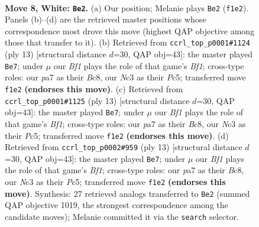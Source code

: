 \documentclass[11pt]{article}
\begin{document}
\begin{figure}[p]\centering
\begin{subfigure}{0.46\textwidth}\centering
\resizebox{\linewidth}{!}{%
\newchessgame
\chessboard[
  setfen={rnbq1rk1/pp2bppp/4pn2/2Pp4/3P4/2N2N2/PP3PPP/R1BQKB1R w KQ - 1 8},
  showmover=false,
  pgfstyle=straightmove, color=movearrow, markmove={f1-e2}
]}
\caption{}
\end{subfigure}\hfill
\begin{subfigure}{0.46\textwidth}\centering
\resizebox{\linewidth}{!}{%
\newchessgame
\chessboard[
  setfen={r1bqkb1r/pp3ppp/2n2n2/2pp4/3P4/5NP1/PP2PPBP/RNBQ1RK1 b kq - 4 7},
  showmover=false,
  pgfstyle=straightmove, color=movearrow, markmove={f8-e7}
]}
\caption{}
\end{subfigure}
\\[4pt]
\begin{subfigure}{0.46\textwidth}\centering
\resizebox{\linewidth}{!}{%
\newchessgame
\chessboard[
  setfen={r1bqkb1r/pp3ppp/2n2n2/2pp4/3P4/5NP1/PP2PPBP/RNBQ1RK1 b kq - 4 7},
  showmover=false,
  pgfstyle=straightmove, color=movearrow, markmove={f8-e7}
]}
\caption{}
\end{subfigure}\hfill
\begin{subfigure}{0.46\textwidth}\centering
\resizebox{\linewidth}{!}{%
\newchessgame
\chessboard[
  setfen={r1bqkb1r/pp3ppp/2n2n2/2pp4/3P4/5NP1/PP2PPBP/RNBQ1RK1 b kq - 4 7},
  showmover=false,
  pgfstyle=straightmove, color=movearrow, markmove={f8-e7}
]}
\caption{}
\end{subfigure}
\caption{\textbf{Move 8, White: \texttt{Be2}.} (a) Our position; Melanie plays \texttt{Be2} (\texttt{f1e2}). Panels (b)--(d) are the retrieved master positions whose correspondence most drove this move (highest QAP objective among those that transfer to it). (b) Retrieved from \texttt{ccrl\_top\_p0001\#1124} (ply 13) [structural distance $d$=30, QAP obj=43]: the master played \texttt{Be7}; under $\mu$ our \emph{Bf1} plays the role of that game's \emph{Bf1}; cross-type roles: our \emph{p}a7 as their \emph{B}c8, our \emph{N}c3 as their \emph{P}c5; transferred move \texttt{f1e2} \textbf{(endorses this move)}. (c) Retrieved from \texttt{ccrl\_top\_p0001\#1125} (ply 13) [structural distance $d$=30, QAP obj=43]: the master played \texttt{Be7}; under $\mu$ our \emph{Bf1} plays the role of that game's \emph{Bf1}; cross-type roles: our \emph{p}a7 as their \emph{B}c8, our \emph{N}c3 as their \emph{P}c5; transferred move \texttt{f1e2} \textbf{(endorses this move)}. (d) Retrieved from \texttt{ccrl\_top\_p0002\#959} (ply 13) [structural distance $d$=30, QAP obj=43]: the master played \texttt{Be7}; under $\mu$ our \emph{Bf1} plays the role of that game's \emph{Bf1}; cross-type roles: our \emph{p}a7 as their \emph{B}c8, our \emph{N}c3 as their \emph{P}c5; transferred move \texttt{f1e2} \textbf{(endorses this move)}. Synthesis: 27 retrieved analogs transferred to \texttt{Be2} (summed QAP objective 1019, the strongest correspondence among the candidate moves); Melanie committed it via the \texttt{search} selector.}
\label{fig:thought-m14}
\end{figure}
\end{document}
